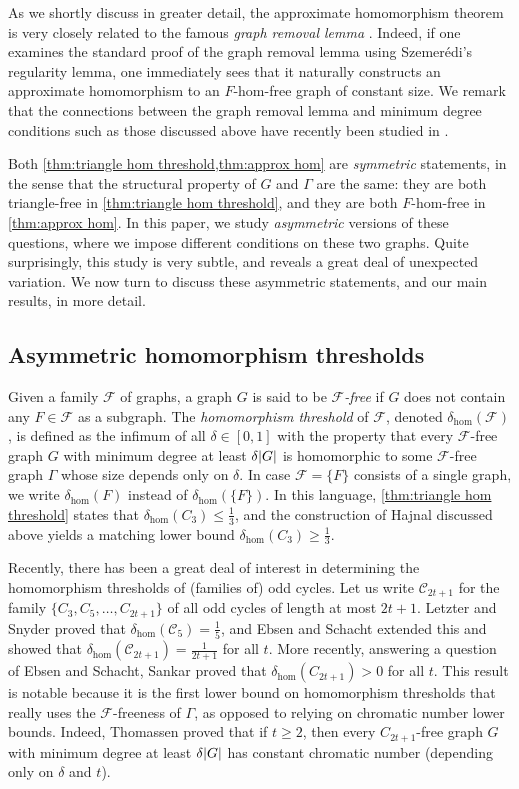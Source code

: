 \documentclass[reqno, english, 12pt]{amsart}
\theoremstyle{plain}
\theoremstyle{remark}
\newcommand{\cF}{\mathcal{F}}
\DeclarePairedDelimiter{\abs}{\lvert}{\rvert}
\renewcommand{\leq}{\leqslant}
\renewcommand{\geq}{\geqslant}
\newcommand\C{\mathscr{C}}
\begin{document}
As we shortly discuss in greater detail, the approximate homomorphism theorem is very closely related to the famous \emph{graph removal lemma} \cite{MR519318,MR1251840,MR1404036}. Indeed, if one examines the standard proof of the graph removal lemma using Szemer\'edi's regularity lemma, one immediately sees that it naturally constructs an approximate homomorphism to an $F$-hom-free graph of constant size. We remark that the connections between the graph removal lemma and minimum degree conditions such as those discussed above have recently been studied in \cite{FW_minimum_degree,GJS_minimum_degree}.

Both \cref{thm:triangle hom threshold,thm:approx hom} are \emph{symmetric} statements, in the sense that the structural property of $G$ and $\Gamma$ are the same: they are both triangle-free in \cref{thm:triangle hom threshold}, and they are both $F$-hom-free in \cref{thm:approx hom}.
In this paper, we study \emph{asymmetric} versions of these questions, where we impose different conditions on these two graphs. Quite surprisingly, this study is very subtle, and reveals a great deal of unexpected variation. We now turn to discuss these asymmetric statements, and our main results, in more detail.

\subsection{Asymmetric homomorphism thresholds}
Given a family $\cF$ of graphs, a graph $G$ is said to be \emph{$\cF$-free} if $G$ does not contain any $F \in \cF$ as a subgraph. The \emph{homomorphism threshold} of $\cF$, denoted $\delta_{\hom}(\cF)$, is defined as the infimum of all $\delta \in [0,1]$ with the property that every $\cF$-free graph $G$ with minimum degree at least $\delta \abs G$ is homomorphic to some $\cF$-free graph $\Gamma$ whose size depends only on $\delta$. In case $\cF = \{F\}$ consists of a single graph, we write $\delta_{\hom}(F)$ instead of $\delta_{\hom}(\{F\})$. In this language, \cref{thm:triangle hom threshold} states that $\delta_{\hom}(C_3) \leq \frac 13$, and the construction of Hajnal discussed above yields a matching lower bound $\delta_{\hom}(C_3) \geq \frac 13$.

Recently, there has been a great deal of interest in determining the homomorphism thresholds of (families of) odd cycles. Let us write $\C_{2t+1}$ for the family $\{C_3,C_5,\dots,C_{2t+1}\}$ of all odd cycles of length at most $2t+1$. Letzter and Snyder \cite{MR3879964} proved that $\delta_{\hom}(\C_5) = \frac 15$, and Ebsen and Schacht \cite{MR4078811} extended this and showed that $\delta_{\hom}(\C_{2t+1})= \frac{1}{2t+1}$ for all $t$. More recently, answering a question of Ebsen and Schacht, Sankar \cite{2206.07525} proved that $\delta_{\hom}(C_{2t+1})>0$ for all $t$. This result is notable because it is the first lower bound on homomorphism thresholds that really uses the $\cF$-freeness of $\Gamma$, as opposed to relying on chromatic number lower bounds. Indeed, Thomassen \cite{MR2321926} proved that if $t \geq 2$, then every $C_{2t+1}$-free graph $G$ with minimum degree at least $\delta \abs G$ has constant chromatic number (depending only on $\delta$ and $t$). 
\end{document}
